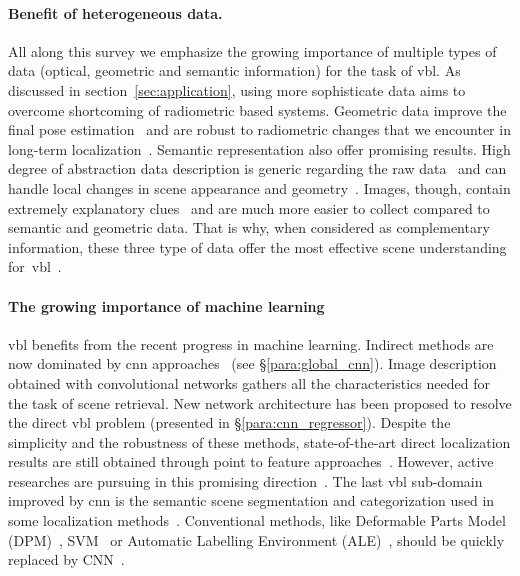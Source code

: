      	\paragraph{Benefit of heterogeneous data.}
	     	All along this survey we emphasize the growing importance of multiple types of data (optical, geometric and semantic information) for the task of \ac{vbl}. As discussed in section~\ref{sec:application}, using more sophisticate data aims to overcome shortcoming of radiometric based systems.
	     	Geometric data improve the final pose estimation~\citep{Pani2015Lmi,Pani2015Robust,Taira2018} and are robust to radiometric changes that we encounter in long-term localization~\citep{Uy2018}. Semantic representation also offer promising results. High degree of abstraction data description is generic regarding the raw data~\citep{Salas-Moreno2013} and can handle local changes in scene appearance and geometry~\citep{Weinzaepfel2019}. Images, though, contain extremely explanatory clues~\citep{Arandjelovic2017} and are much more easier to collect compared to semantic and geometric data. That is why, when considered as complementary information, these three type of data offer the most effective scene understanding for~\ac{vbl}~\citep{Schonberger2017a}.	     		     	
	     	
     
		\paragraph{The growing importance of machine learning}
			\ac{vbl} benefits from the recent progress in machine learning. Indirect methods are now dominated by \ac{cnn} approaches~\citep{Radenovic2016,Gordo2016} (see \S\ref{para:global_cnn}). Image description obtained with convolutional networks gathers all the characteristics needed for the task of scene retrieval. New network architecture has been proposed to resolve the direct \ac{vbl} problem (presented in \S\ref{para:cnn_regressor}). Despite the simplicity and the robustness of these methods, state-of-the-art direct localization results are still obtained through point to feature approaches~\citep{Walch2016a}. However, active researches are pursuing in this promising direction~\citep{Liu2016,Jia2016,Kendall2017}. The last \ac{vbl} sub-domain improved by \ac{cnn} is the semantic scene segmentation and categorization used in some localization methods~\citep{Salas-Moreno2013,Ardeshir2014,Arth2015,Christie2016}. Conventional methods, like Deformable Parts Model (DPM)~\citep{Ardeshir2014}, SVM~\citep{Arth2015} or Automatic Labelling Environment (ALE)~\citep{Christie2016}, should be quickly replaced by CNN~\citep{Sunderhauf2015a,Zhao2016}.
     
